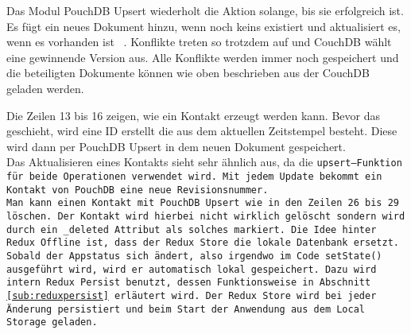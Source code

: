Das Modul PouchDB Upsert wiederholt die Aktion solange, bis sie erfolgreich ist.
Es fügt ein neues Dokument hinzu, wenn noch keins existiert und aktualisiert es, wenn es vorhanden ist ~\cite{pouch_conflicts}.
Konflikte treten so trotzdem auf und CouchDB wählt eine gewinnende Version aus.
Alle Konflikte werden immer noch gespeichert und die beteiligten Dokumente können wie oben beschrieben aus der CouchDB geladen werden.\\
%
\begin{center}
  
\end{center}
%
Die Zeilen 13 bis 16 zeigen, wie ein Kontakt erzeugt werden kann. Bevor das geschieht, wird eine ID erstellt die aus dem aktuellen Zeitstempel besteht.
Diese wird dann per PouchDB Upsert in dem neuen Dokument gespeichert.\\
Das Aktualisieren eines Kontakts sieht sehr ähnlich aus, da die \tt{upsert}--Funktion für beide Operationen verwendet wird.
Mit jedem Update bekommt ein Kontakt von PouchDB eine neue Revisionsnummer.\\
Man kann einen Kontakt mit PouchDB Upsert wie in den Zeilen 26 bis 29 löschen.
Der Kontakt wird hierbei nicht wirklich gelöscht sondern wird durch ein \tt{\_deleted} Attribut als solches markiert.
%
%
Die Idee hinter Redux Offline ist, dass der Redux Store die lokale Datenbank ersetzt.
Sobald der \gls{App}status sich ändert, also irgendwo im Code \tt{setState()} ausgeführt wird, wird er automatisch lokal gespeichert.
Dazu wird intern Redux Persist benutzt, dessen Funktionsweise in Abschnitt \ref{sub:reduxpersist} erläutert wird.
Der Redux Store wird bei jeder Änderung persistiert und beim Start der Anwendung aus dem Local Storage geladen.\\
